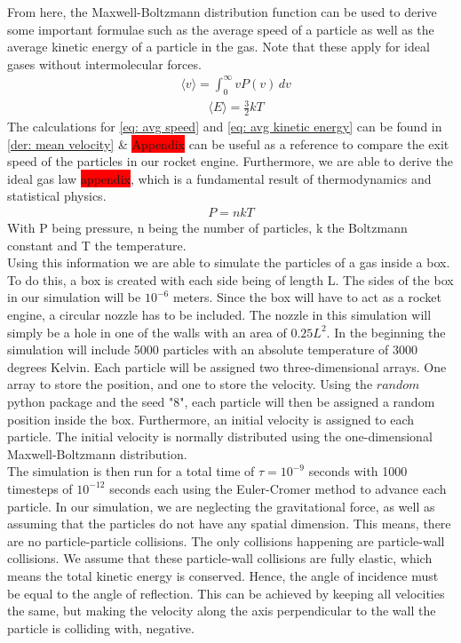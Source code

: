 \documentclass[reprint,english,notitlepage]{revtex4-2}
\begin{document}
From here, the Maxwell-Boltzmann distribution function can be used to derive some important formulae such as the average speed of a particle as well as the average kinetic energy of a particle in the gas.
Note that these apply for ideal gases without intermolecular forces.
\begin{align}\label{eq: avg speed}
    &\langle v \rangle = \int_{0}^{\infty} vP(v)\,dv  
\end{align}
\begin{align}\label{eq: avg kinetic energy}
	&\langle E \rangle = \frac{3}{2}kT
\end{align}
The calculations for \ref{eq: avg speed} and \ref{eq: avg kinetic energy} can be found in \ref{der: mean velocity} \& \colorbox{red}{Appendix} can be useful as a reference to compare the exit speed of the particles in our rocket engine.
Furthermore, we are able to derive the ideal gas law \colorbox{red}{appendix}, which is a fundamental result of thermodynamics and statistical physics.
\begin{align*}
    P = nkT
\end{align*}
With P being pressure, n being the number of particles, k the Boltzmann constant and T the temperature.\\

Using this information we are able to simulate the particles of a gas inside a box.
To do this, a box is created with each side being of length L. The sides of the box in our simulation will be $10^{-6}$ meters.
Since the box will have to act as a rocket engine, a circular nozzle has to be included.
The nozzle in this simulation will simply be a hole in one of the walls with an area of $0.25L^{2}$.
In the beginning the simulation will include 5000 particles with an absolute temperature of 3000 degrees Kelvin.
Each particle will be assigned two three-dimensional arrays. One array to store the position, and one to store the velocity.
Using the $random$ python package and the seed "8", each particle will then be assigned a random position inside the box.
Furthermore, an initial velocity is assigned to each particle. The initial velocity is normally distributed using the one-dimensional Maxwell-Boltzmann distribution.\\
The simulation is then run for a total time of $\tau = 10^{-9}$ seconds with 1000 timesteps of $10^{-12}$ seconds each using the Euler-Cromer method to advance each particle.
In our simulation, we are neglecting the gravitational force, as well as assuming that the particles do not have any spatial dimension.
This means, there are no particle-particle collisions. The only collisions happening are particle-wall collisions.
We assume that these particle-wall collisions are fully elastic, which means the total kinetic energy is conserved.
Hence, the angle of incidence must be equal to the angle of reflection.
This can be achieved by keeping all velocities the same, but making the velocity along the axis perpendicular to the wall the particle is colliding with, negative.
\end{document}
